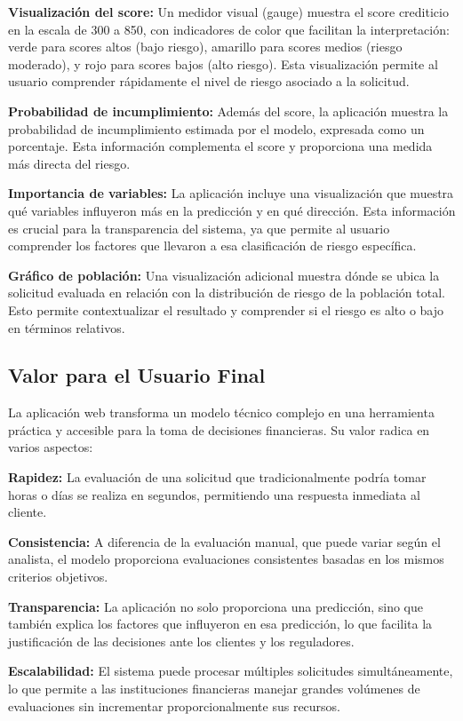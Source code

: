 \documentclass[12pt,a4paper]{article}
\begin{document}
\textbf{Visualización del score:} Un medidor visual (gauge) muestra el score crediticio en la escala de 300 a 850, con indicadores de color que facilitan la interpretación: verde para scores altos (bajo riesgo), amarillo para scores medios (riesgo moderado), y rojo para scores bajos (alto riesgo). Esta visualización permite al usuario comprender rápidamente el nivel de riesgo asociado a la solicitud.

\textbf{Probabilidad de incumplimiento:} Además del score, la aplicación muestra la probabilidad de incumplimiento estimada por el modelo, expresada como un porcentaje. Esta información complementa el score y proporciona una medida más directa del riesgo.

\textbf{Importancia de variables:} La aplicación incluye una visualización que muestra qué variables influyeron más en la predicción y en qué dirección. Esta información es crucial para la transparencia del sistema, ya que permite al usuario comprender los factores que llevaron a esa clasificación de riesgo específica.

\textbf{Gráfico de población:} Una visualización adicional muestra dónde se ubica la solicitud evaluada en relación con la distribución de riesgo de la población total. Esto permite contextualizar el resultado y comprender si el riesgo es alto o bajo en términos relativos.

\subsection{Valor para el Usuario Final}

La aplicación web transforma un modelo técnico complejo en una herramienta práctica y accesible para la toma de decisiones financieras. Su valor radica en varios aspectos:

\textbf{Rapidez:} La evaluación de una solicitud que tradicionalmente podría tomar horas o días se realiza en segundos, permitiendo una respuesta inmediata al cliente.

\textbf{Consistencia:} A diferencia de la evaluación manual, que puede variar según el analista, el modelo proporciona evaluaciones consistentes basadas en los mismos criterios objetivos.

\textbf{Transparencia:} La aplicación no solo proporciona una predicción, sino que también explica los factores que influyeron en esa predicción, lo que facilita la justificación de las decisiones ante los clientes y los reguladores.

\textbf{Escalabilidad:} El sistema puede procesar múltiples solicitudes simultáneamente, lo que permite a las instituciones financieras manejar grandes volúmenes de evaluaciones sin incrementar proporcionalmente sus recursos.
\end{document}
